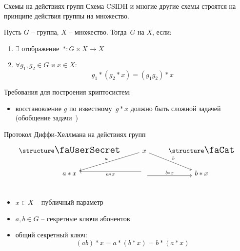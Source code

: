 \documentclass{beamer}
\begin{document}
\begin{frame}{Схемы на действиях групп}
Схема CSIDH и многие другие схемы строятся на принципе действия группы на множество.
\vspace{0.5em}
    \begin{tcolorbox}[colframe=title-and-section-color!120, colback=title-and-section-color!5, title=Определение, center title]
				Пусть $G$ -- группа, $X$ -- множество. Тогда~$G$  на $X$, если:
	\begin{enumerate}
		\item $\exists$ отображение~$*: G \times X \rightarrow X$
		\item $\forall g_1, g_2 \in G$ и $x \in X$:
		\[g_1 * (g_2 * x) = (g_1 g_2) * x\]
	\end{enumerate}
	\end{tcolorbox}

	Требования для построения криптосистем:
	\begin{itemize}
		\item восстановление $g$ по известному~$g * x$ должно быть сложной задачей (обобщение задачи~)
	\end{itemize}
\end{frame}

\begin{frame}[fragile]{Протокол Диффи-Хеллмана на действиях групп}
	\[
	\begin{tikzcd}
		\text{\UserA} &\arrow{ld}[swap]{a} x  \arrow{rd}{b} & \text{\UserB} \\
		a * x &
		\arrow[yshift=-0.7ex]{r}{b * x}
		\arrow[yshift=0.7ex]{l}{a * x}
		& b * x\\
	\end{tikzcd}
	\]
	\begin{itemize}
		\item $x \in X$ -- публичный параметр
		\item $a,b \in G$ -- секретные ключи абонентов
		\item общий секретный ключ:
		\[(a b) * x = a * (b * x) = b * (a * x)\]
	\end{itemize}
\end{frame}
\end{document}
